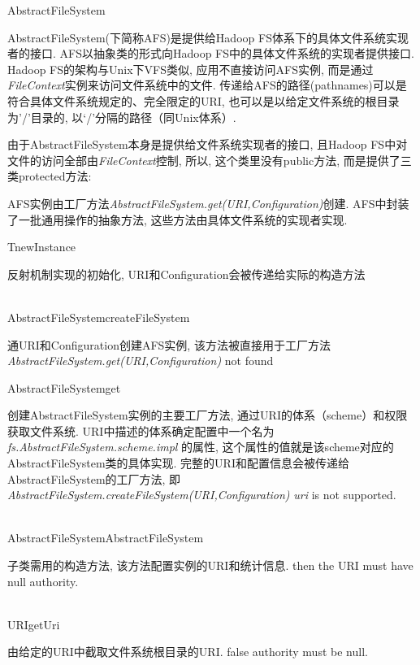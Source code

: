 \begin{XeClass}{AbstractFileSystem}
   
 AbstractFileSystem(下简称AFS)是提供给Hadoop FS体系下的具体文件系统实现者的接口.
 AFS以抽象类的形式向Hadoop FS中的具体文件系统的实现者提供接口.
 Hadoop FS的架构与Unix下VFS类似, 应用不直接访问AFS实例,
 而是通过\emph{FileContext}实例来访问文件系统中的文件.
 传递给AFS的路径(pathnames)可以是符合具体文件系统规定的、完全限定的URI,
 也可以是以给定文件系统的根目录为'/'目录的, 以‘/’分隔的路径（同Unix体系）.
 
 由于AbstractFileSystem本身是提供给文件系统实现者的接口,
 且Hadoop FS中对文件的访问全部由\emph{FileContext}控制, 所以,
 这个类里没有public方法, 而是提供了三类protected方法:
 
 AFS实例由工厂方法\emph{AbstractFileSystem.get(URI,Configuration)}创建.
 AFS中封装了一批通用操作的抽象方法, 这些方法由具体文件系统的实现者实现.

  \begin{XeMethod}{}{T}{newInstance}
       
 反射机制实现的初始化, URI和Configuration会被传递给实际的构造方法

  \end{XeMethod}

  \begin{XeMethod}{\XePrivate\\ }{AbstractFileSystem}{createFileSystem}
       
 通URI和Configuration创建AFS实例,
 该方法被直接用于工厂方法\emph{AbstractFileSystem.get(URI,Configuration)}
 not found

  \end{XeMethod}

  \begin{XeMethod}{}{AbstractFileSystem}{get}
       
 创建AbstractFileSystem实例的主要工厂方法, 通过URI的体系（scheme）和权限获取文件系统.
 URI中描述的体系确定配置中一个名为
 \emph{fs.AbstractFileSystem.scheme.impl}
 的属性, 这个属性的值就是该scheme对应的AbstractFileSystem类的具体实现.
 完整的URI和配置信息会被传递给AbstractFileSystem的工厂方法, 即\emph{AbstractFileSystem.createFileSystem(URI,Configuration)}
 \emph{uri} is not supported.

  \end{XeMethod}

  \begin{XeMethod}{\XeProtected\\ }{AbstractFileSystem}{AbstractFileSystem}
       
 子类需用的构造方法, 该方法配置实例的URI和统计信息.
 then the URI must have null authority.

  \end{XeMethod}

  \begin{XeMethod}{\XePrivate\\ }{URI}{getUri}
       
 由给定的URI中截取文件系统根目录的URI.
 false authority must be null.

  \end{XeMethod}

\end{XeClass}
